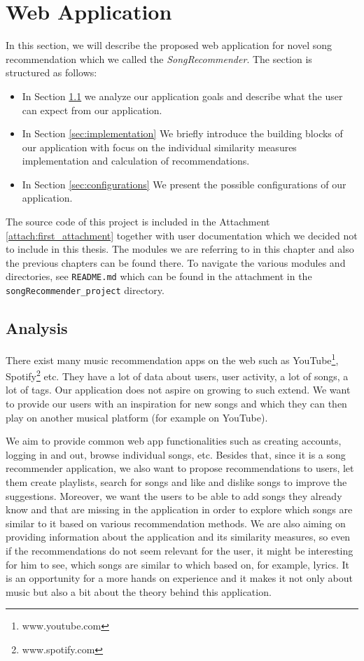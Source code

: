 \chapter{Web Application}\label{chap:web_app}

In this section, we will describe the proposed web application for novel song recommendation which we called the \textit{SongRecommender}. The section is structured as follows: 
\begin{itemize}
    \item In Section \ref{sec:analysis} we analyze our application goals and describe what the user can expect from our application.
    \item In Section \ref{sec:implementation} We briefly introduce the building blocks of our application with focus on the individual similarity measures implementation and calculation of recommendations.
    \item In Section \ref{sec:configurations} We present the possible configurations of our application.
\end{itemize}

 The source code of this project is included in the Attachment \ref{attach:first_attachment} together with user documentation which we decided not to include in this thesis. The modules we are referring to in this chapter and also the previous chapters can be found there. To navigate the various modules and directories, see \texttt{README.md} which can be found in the attachment in the \texttt{songRecommender\_project} directory.
 
\section{Analysis}\label{sec:analysis}

There exist many music recommendation apps on the web such as YouTube\footnote{www.youtube.com}, Spotify\footnote{www.spotify.com} etc. They have a lot of data about users, user activity, a lot of songs, a lot of tags. Our application does not aspire on growing to such extend. We want to provide our users with an inspiration for new songs and which they can then play on another musical platform (for example on YouTube). 

We aim to provide common web app functionalities such as creating accounts, logging in and out, browse individual songs, etc. Besides that, since it is a song recommender application, we also want to propose recommendations to users, let them create playlists, search for songs and like and dislike songs to improve the suggestions. Moreover, we want the users to be able to add songs they already know and that are missing in the application in order to explore which songs are similar to it based on various recommendation methods. We are also aiming on providing information about the application and its similarity measures, so even if the recommendations do not seem relevant for the user, it might be interesting for him to see, which songs are similar to which based on, for example, lyrics. It is an opportunity for a more hands on experience and it makes it not only about music but also a bit about the theory behind this application. 

